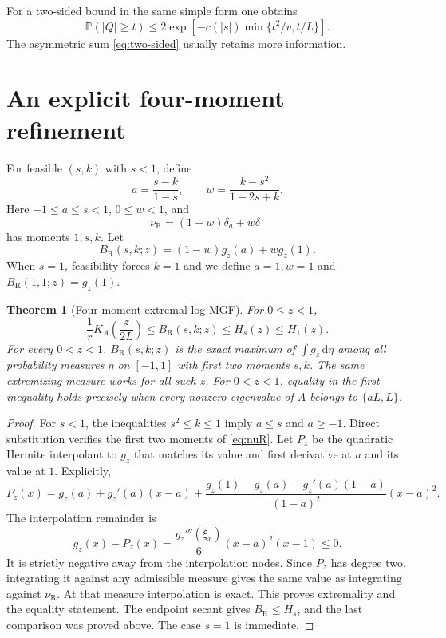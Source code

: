 \documentclass[11pt,letterpaper]{article}
\numberwithin{equation}{section}
\newtheorem{theorem}{Theorem}[section]
\theoremstyle{definition}\newtheorem{definition}[theorem]{Definition}
\theoremstyle{remark}\newtheorem{remark}[theorem]{Remark}
\newcommand{\PP}{\mathbb P}
\newcommand{\dd}{\,\mathrm d}
\newcommand{\bRad}{B_{\mathrm R}}
\begin{document}
For a two-sided bound in the same simple form one obtains
\begin{equation}
 \PP(|Q|\ge t)\le
 2\exp[-c(|s|)\min\{t^2/v,t/L\}].
\end{equation}
The asymmetric sum \eqref{eq:two-sided} usually retains more information.

\section{An explicit four-moment refinement}\label{sec:radau}

For feasible $(s,k)$ with $s<1$, define
\begin{equation}\label{eq:radau-nodes}
 a=\frac{s-k}{1-s},\qquad
 w=\frac{k-s^2}{1-2s+k}.
\end{equation}
Here $-1\le a\le s<1$, $0\le w<1$, and
\begin{equation}\label{eq:nuR}
 \nu_{\mathrm R}=(1-w)\delta_a+w\delta_1
\end{equation}
has moments $1,s,k$. Let
\begin{equation}\label{eq:BR}
 \bRad(s,k;z)=(1-w)g_z(a)+wg_z(1).
\end{equation}
When $s=1$, feasibility forces $k=1$ and we define $a=1,w=1$ and
$\bRad(1,1;z)=g_z(1)$.

\begin{theorem}[Four-moment extremal log-MGF]\label{thm:radau}
For $0\le z<1$,
\begin{equation}\label{eq:hierarchy}
 \frac1rK_A\left(\frac z{2L}\right)
 \le\bRad(s,k;z)\le H_s(z)\le H_1(z).
\end{equation}
For every $0<z<1$, $\bRad(s,k;z)$ is the exact maximum of
$\int g_z\dd\eta$ among all probability measures $\eta$ on $[-1,1]$
with first two moments $s,k$. The same extremizing measure works for
all such $z$. For $0<z<1$, equality in the first inequality holds precisely when every
nonzero eigenvalue of $A$ belongs to $\{aL,L\}$.
\end{theorem}
\begin{proof}
For $s<1$, the inequalities $s^2\le k\le1$ imply $a\le s$ and
$a\ge-1$. Direct substitution verifies the first two moments of
\eqref{eq:nuR}. Let $P_z$ be the quadratic Hermite interpolant to
$g_z$ that matches its value and first derivative at $a$ and its
value at $1$. Explicitly,
\[
 P_z(x)=g_z(a)+g_z'(a)(x-a)
 +\frac{g_z(1)-g_z(a)-g_z'(a)(1-a)}{(1-a)^2}(x-a)^2.
\]
The interpolation remainder is
\[
 g_z(x)-P_z(x)=\frac{g_z'''(\xi_x)}6(x-a)^2(x-1)\le0.
\]
It is strictly negative away from the interpolation nodes. Since
$P_z$ has degree two, integrating it against any admissible measure
gives the same value as integrating against $\nu_{\mathrm R}$.
At that measure interpolation is exact. This proves extremality and
the equality statement. The endpoint secant gives
$\bRad\le H_s$, and the last comparison was proved above. The case
$s=1$ is immediate.
\end{proof}
\end{document}
